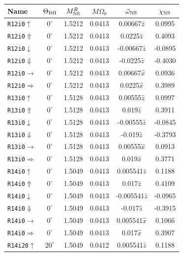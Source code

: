 \begin{longtable}{l|c|c|c|c|c}
\centering
\label{tab:36sets}
Name & $\Theta_{\rm BH}$ & $M^B_{\rm NS}$ & $M\Omega_{0}$ & {$\vec{\omega}_{\rm NS}$} & $\chi_{\rm NS}$ 
\\
\hline
{\tt R12i0$\uparrow$}&$0^\circ$ & 1.5212 & 0.0413  & 0.00667{$\hat{z}$}\hfill & 0.0995 \\
{\tt R12i0$\Uparrow$}&$0^\circ$ & 1.5212 & 0.0413  & 0.0225$\hat{z}$ & 0.4093 \\
{\tt R12i0$\downarrow$}&$0^\circ$ & 1.5212 & 0.0413  & -0.00667$\hat{z}$& -0.0895\\
{\tt R12i0$\Downarrow$}&$0^\circ$ & 1.5212 & 0.0413  & -0.0225$\hat{z}$ & -0.4030 \\
{\tt R12i0$\rightarrow$}&$0^\circ$ & 1.5212 & 0.0413  & 0.00667$\hat{x}$ & 0.0936\\
{\tt R12i0$\Rightarrow$}&$0^\circ$ & 1.5212 & 0.0413  & 0.0225$\hat{x}$ & 0.3989 \\
\hline
{\tt R13i0$\uparrow$}&$0^\circ$ & 1.5128 & 0.0413   & 0.00555$\hat{z}$ & 0.0997 \\
{\tt R13i0$\Uparrow$}&$0^\circ$ & 1.5128 & 0.0413  & 0.019$\hat{z}$ & 0.3911 \\
{\tt R13i0$\downarrow$}&$0^\circ$ & 1.5128 & 0.0413  & -0.00555$\hat{z}$ & -0.0845\\
{\tt R13i0$\Downarrow$}&$0^\circ$ & 1.5128 & 0.0413  & -0.019$\hat{z}$ & -0.3793 \\
{\tt R13i0$\rightarrow$}&$0^\circ$ & 1.5128 & 0.0413 &  0.00555$\hat{x}$ & 0.0913\\
{\tt R13i0$\Rightarrow$}&$0^\circ$ & 1.5128 & 0.0413  & 0.019$\hat{x}$ & 0.3771 \\
\hline
{\tt R14i0$\uparrow$}&$0^\circ$ & 1.5049 & 0.0413 &  0.005541$\hat{z}$ & 0.1188\\
{\tt R14i0$\Uparrow$}&$0^\circ$ & 1.5049 & 0.0413 &  0.017$\hat{z}$ & 0.4109\\
{\tt R14i0$\downarrow$}&$0^\circ$ & 1.5049 & 0.0413 & -0.005541$\hat{z}$& -0.0965\\
{\tt R14i0$\Downarrow$}&$0^\circ$ & 1.5049 & 0.0413  & -0.017$\hat{z}$ & -0.3915\\
{\tt R14i0$\rightarrow$}&$0^\circ$ & 1.5049 & 0.0413  & 0.005541$\hat{x}$ & 0.1066\\
{\tt R14i0$\Rightarrow$}&$0^\circ$ & 1.5049 & 0.0413  & 0.017$\hat{x}$ & 0.3907\\
\hline
{\tt R14i20$\uparrow$}&$20^\circ$ & 1.5049 & 0.0412  & 0.005541$\hat{z}$ & 0.1188 \\

\end{longtable}
